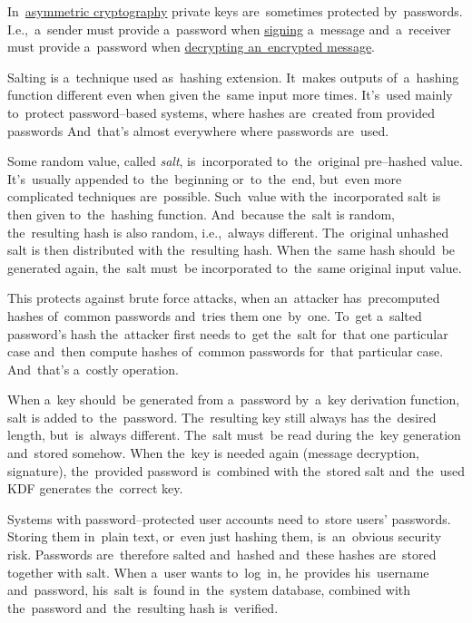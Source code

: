 In~\hyperref[asymmetriccryptography]{asymmetric cryptography} private keys are~sometimes protected by~passwords.
I.e.,~a~sender must provide a~password when \hyperref[electronicsignature]{signing} a~message and~a~receiver must provide a~password when \hyperref[asymmetriccryptography]{decrypting an~encrypted message}.

Salting is a~technique used as~hashing extension.
It~makes outputs of~a~hashing function different even when given the~same input more times.
It's~used mainly to~protect password--based systems, where hashes are~created from provided passwords
And~that's almost everywhere where passwords are~used.

Some random value, called \textit{salt}, is~incorporated to~the~original pre--hashed value.
It's~usually appended to~the~beginning or~to~the~end, but~even more complicated techniques are~possible.
Such~value with the~incorporated salt is then given to~the~hashing function.
And~because the~salt is random, the~resulting hash is also random, i.e.,~always different.
The~original unhashed salt is then distributed with the~resulting hash.
When the~same hash should~be generated again, the~salt must~be incorporated to~the~same original input value.

This protects against brute force attacks, when an~attacker has~precomputed hashes of~common passwords and~tries them one~by~one.
To~get a~salted password's hash the~attacker first needs to~get the~salt for~that one particular case and~then compute hashes of~common passwords for~that particular case.
And~that's a~costly operation.

When a~key should~be generated from a~password by~a~key derivation function, salt is added to~the~password.
The~resulting key still always has the~desired length, but~is~always different.
The~salt must~be read during the~key generation and~stored somehow.
When the~key is needed again (message decryption, signature), the~provided password is~combined with the~stored salt and~the~used KDF generates the~correct key.

Systems with password--protected user accounts need to~store users' passwords.
Storing them in~plain text, or~even just hashing them, is~an~obvious security risk.
Passwords are~therefore salted and~hashed and~these hashes are~stored together with salt.
When a~user wants to~log~in, he~provides his~username and~password, his~salt is~found in~the~system database, combined with the~password and~the~resulting hash is~verified.

